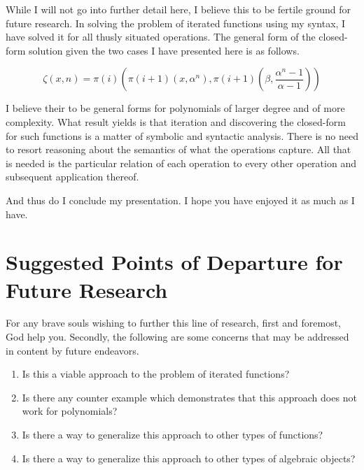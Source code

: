 While I will not go into further detail here, I believe this to be fertile
ground for future research. In solving the problem of iterated functions using
my syntax, I have solved it for all thusly situated operations. The general
form of the closed-form solution given the two cases I have presented here is
as follows.

\begin{equation}
    \zeta(x,n) = \pi(i)(\pi(i+1)(x, \alpha^n), \pi(i+1)(\beta, \frac{\alpha^n-1}{\alpha-1}))
\end{equation}

I believe their to be general forms for polynomials of larger degree and of
more complexity. What result yields is that iteration and discovering the
closed-form for such functions is a matter of symbolic and syntactic analysis.
There is no need to resort reasoning about the semantics of what the operations
capture. All that is needed is the particular relation of each operation to
every other operation and subsequent application thereof.

And thus do I conclude my presentation. I hope you have enjoyed it as much as I
have.

\section{Suggested Points of Departure for Future Research}
For any brave souls wishing to further this line of research, first and
foremost, God help you. Secondly, the following are some concerns that may be
addressed in content by future endeavors.

\begin{enumerate}
    \item Is this a viable approach to the problem of iterated functions?
    \item Is there any counter example which demonstrates that this approach does not
          work for polynomials?
    \item Is there a way to generalize this approach to other types of functions?
    \item Is there a way to generalize this approach to other types of algebraic objects?
\end{enumerate}